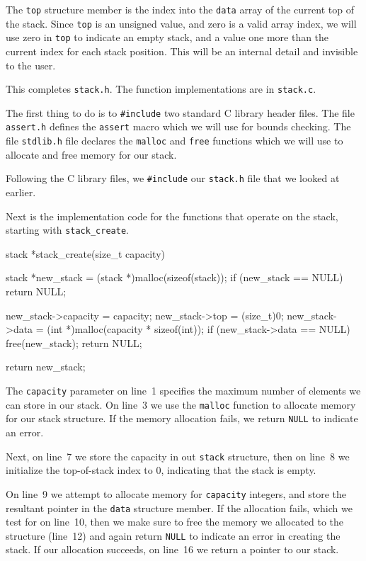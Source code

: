 \documentclass{article}
\begin{document}
  The \verb|top| structure member is the index into the \verb|data| array of the current top of the stack. Since \verb|top| is an unsigned value, and zero is a valid array index, we will use zero in \verb|top| to indicate an empty stack, and a value one more than the current index for each stack position. This will be an internal detail and invisible to the user.

  This completes \verb|stack.h|. The function implementations are in \verb|stack.c|.

  The first thing to do is to \verb|#include| two standard C library header files. The file \verb|assert.h| defines the \verb|assert| macro which we will use for bounds checking. The file \verb|stdlib.h| file declares the \verb|malloc| and \verb|free| functions which we will use to allocate and free memory for our stack.

  Following the C library files, we \verb|#include| our \verb|stack.h| file that we looked at earlier.

  Next is the implementation code for the functions that operate on the stack, starting with \verb|stack_create|.
  \begin{lstc}[firstnumber=1]
stack *stack_create(size_t capacity)
{
  stack *new_stack = (stack *)malloc(sizeof(stack));
  if (new_stack == NULL)
    return NULL;

  new_stack->capacity = capacity;
  new_stack->top = (size_t)0;
  new_stack->data = (int *)malloc(capacity * sizeof(int));
  if (new_stack->data == NULL)
  {
    free(new_stack);
    return NULL;
  }

  return new_stack;
}\end{lstc}
  The \verb|capacity| parameter on line~1 specifies the maximum number of elements we can store in our stack. On line~3 we use the \verb|malloc| function to allocate memory for our stack structure. If the memory allocation fails, we return \verb|NULL| to indicate an error.

  Next, on line~7 we store the capacity in out \verb|stack| structure, then on line~8 we initialize the top-of-stack index to 0, indicating that the stack is empty.

  On line~9 we attempt to allocate memory for \verb|capacity| integers, and store the resultant pointer in the \verb|data| structure member. If the allocation fails, which we test for on line~10, then we make sure to free the memory we allocated to the structure (line~12) and again return \verb|NULL| to indicate an error in creating the stack. If our allocation succeeds, on line~16 we return a pointer to our stack.
\end{document}
